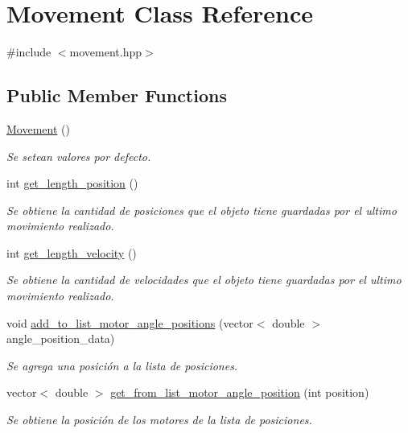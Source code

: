 \hypertarget{class_movement}{\section{Movement Class Reference}
\label{class_movement}
}


{\ttfamily \#include $<$movement.\-hpp$>$}

\subsection*{Public Member Functions}
\begin{DoxyCompactItemize}
\item 
\hyperlink{class_movement_ae0493997549e8b3ead5146bea074010d}{Movement} ()
\begin{DoxyCompactList}\small\item\em Se setean valores por defecto. \end{DoxyCompactList}\item 
int \hyperlink{class_movement_af617179c4f9d600397dd780553464bdc}{get\-\_\-length\-\_\-position} ()
\begin{DoxyCompactList}\small\item\em Se obtiene la cantidad de posiciones que el objeto tiene guardadas por el ultimo movimiento realizado. \end{DoxyCompactList}\item 
int \hyperlink{class_movement_adba12b00ba14057471a869fc65615f66}{get\-\_\-length\-\_\-velocity} ()
\begin{DoxyCompactList}\small\item\em Se obtiene la cantidad de velocidades que el objeto tiene guardadas por el ultimo movimiento realizado. \end{DoxyCompactList}\item 
void \hyperlink{class_movement_a390ed24cd1530a9d5746d05c23bdbd40}{add\-\_\-to\-\_\-list\-\_\-motor\-\_\-angle\-\_\-positions} (vector$<$ double $>$ angle\-\_\-position\-\_\-data)
\begin{DoxyCompactList}\small\item\em Se agrega una posición a la lista de posiciones. \end{DoxyCompactList}\item 
vector$<$ double $>$ \hyperlink{class_movement_a9ecca745f7402967fc19588e0b9874dd}{get\-\_\-from\-\_\-list\-\_\-motor\-\_\-angle\-\_\-position} (int position)
\begin{DoxyCompactList}\small\item\em Se obtiene la posición de los motores de la lista de posiciones. \end{DoxyCompactList}\item 

\end{DoxyCompactItemize}
